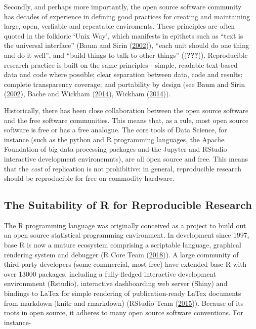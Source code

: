 \documentclass[11pt,preprint, authoryear]{elsarticle}
\numberwithin{equation}{section}
\numberwithin{figure}{section}
\numberwithin{table}{section}
\begin{document}
Secondly, and perhaps more importantly, the open source software
community has decades of experience in defining good practices for
creating and maintaining large, open, verfiable and repeatable
enviroments. These principles are often quoted in the folkloric `Unix
Way', which manifests in epithets such as ``text is the universal
interface'' (Baum and Sirin (\protect\hyperlink{ref-Baum2002}{2002})),
``each unit should do one thing and do it well'', and ``build things to
talk to other things'' (({\textbf{???}})). Reproducible research
practice is built on the same principles - simple, readable text-based
data and code where possible; clear separation between data, code and
results; complete transparency coverage; and portability by design (see
Baum and Sirin (\protect\hyperlink{ref-Baum2002}{2002}), Bache and
Wickham (\protect\hyperlink{ref-Bache2014}{2014}), Wickham
(\protect\hyperlink{ref-Wickham2014}{2014})).

Historically, there has been close collaboration between the open source
software and the free software communities. This means that, as a rule,
most open source software is free or has a free analogue. The core tools
of Data Science, for instance (such as the python and R programming
languages, the Apache Foundation of big data processing packages and the
Jupyter and RStudio interactive development environemnts), are all open
source and free. This means that the \emph{cost} of replication is not
prohibitive: in general, reproducible research should be reproducible
for free on commodity hardware.

\subsection{The Suitability of R for Reproducible
Research}\label{the-suitability-of-r-for-reproducible-research}

The R programming language was originally conceived as a project to
build out an open source statistical programming environment. In
development since 1997, base R is now a mature ecosystem comprising a
scriptable language, graphical rendering system and debugger (R Core
Team (\protect\hyperlink{ref-RCoreTeam2018}{2018})). A large community
of third party developers (some commercial, most free) have extended
base R with over 13000 packages, including a fully-fledged interactive
development environmnent (Rstudio), interactive dashboarding web server
(Shiny) and bindings to LaTex for simple rendering of publication-ready
LaTex documents from markdown (knitr and rmarkdown) (RStudio Team
(\protect\hyperlink{ref-RStudioTeam2015}{2015})). Because of its roots
in open source, it adheres to many open source software conventions. For
instance-
\end{document}
